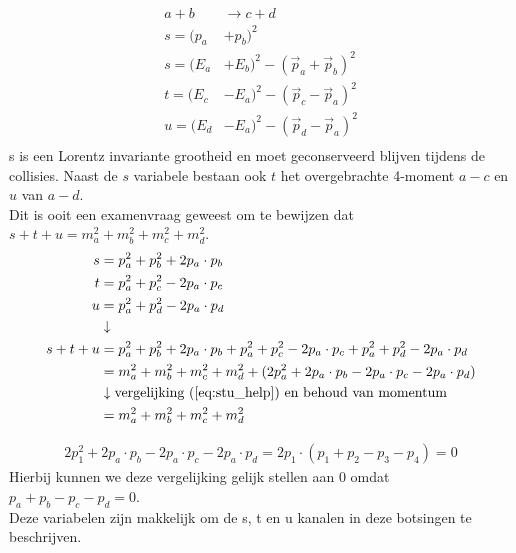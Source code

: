\documentclass[../main.tex]{subfiles}
\begin{document}
\begin{equation}
    \begin{aligned}
        \label{eq:mandelstam}
        a+b&\rightarrow c+d\\
        s=(p_a&+p_b)^2\\
        s=(E_a&+E_b)^2-(\vec{p}_a + \vec{p}_b)^2\\
        t=(E_c&-E_a)^2-(\vec{p}_c - \vec{p}_a)^2\\
        u=(E_d&-E_a)^2-(\vec{p}_d - \vec{p}_a)^2\\
    \end{aligned}
\end{equation}
s is een Lorentz invariante grootheid en moet geconserveerd blijven tijdens de collisies. Naast de $s$ variabele bestaan ook $t$ het overgebrachte 4-moment $a-c$ en $u$ van $a-d$.\\
Dit is ooit een examenvraag geweest om te bewijzen dat $s+t+u=m_a^2+m_b^2+m_c^2+m_d^2$.
\begin{equation}
    \begin{aligned}
        \label{eq:stu_bewijs}
        s&=p_a^2+p_b^2+2p_a\cdot p_b\\
        t&=p_a^2+p_c^2-2p_a\cdot p_c\\
        u&=p_a^2+p_d^2-2p_a\cdot p_d\\
         &\downarrow\\
        s+t+u&=p_a^2+p_b^2+2p_a\cdot p_b + p_a^2+p_c^2-2p_a\cdot p_c + p_a^2+p_d^2-2p_a\cdot p_d\\
             &=m_a^2+m_b^2+m_c^2+m_d^2+(2p_a^2+2p_a\cdot p_b-2p_a\cdot p_c-2p_a\cdot p_d)\\
             &\downarrow \text{vergelijking (\ref{eq:stu_help}) en behoud van momentum}\\
             &=m_a^2+m_b^2+m_c^2+m_d^2
    \end{aligned}
\end{equation}

\begin{equation}
    \begin{aligned}
        \label{eq:stu_help}
        2p_1^2+2p_a\cdot p_b-2p_a\cdot p_c-2p_a\cdot p_d = 2p_1\cdot (p_1 + p_2 - p_3 -p_4) = 0
    \end{aligned}
\end{equation}
Hierbij kunnen we deze vergelijking gelijk stellen aan $0$ omdat $p_a + p_b - p_c -p_d = 0$.\\
Deze variabelen zijn makkelijk om de s, t en u kanalen in deze botsingen te beschrijven.
\end{document}

